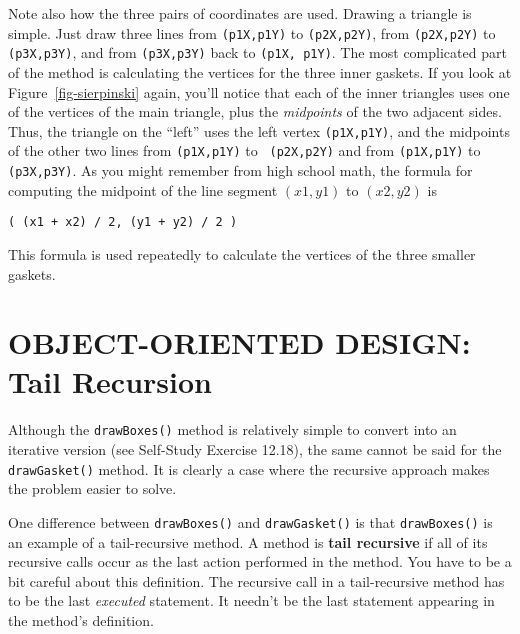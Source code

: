 Note also how the three pairs of coordinates are used.  Drawing a
triangle is simple.  Just draw three lines from {\tt (p1X,p1Y)} to
{\tt (p2X,p2Y)}, from {\tt (p2X,p2Y)} to {\tt (p3X,p3Y)}, and from
{\tt (p3X,p3Y)} back to {\tt (p1X, p1Y)}. The most complicated part of
the method is calculating the vertices for the three inner gaskets.
If you look at Figure~\ref{fig-sierpinski} again, you'll notice that
each of the inner triangles uses one of the vertices of the main
triangle, plus the {\it midpoints} of the two adjacent sides.  Thus,
the triangle on the ``left'' uses the left vertex {\tt (p1X,p1Y)}, and
the midpoints of the other two lines from {\tt (p1X,p1Y)} to {\tt
(p2X,p2Y)} and from {\tt (p1X,p1Y)} to {\tt (p3X,p3Y)}.  As you might
remember from high school math, the formula for computing the midpoint
of the line segment $(x1,y1)$ to $(x2,y2)$ is

\begin{jjjlisting}
\begin{lstlisting}
( (x1 + x2) / 2, (y1 + y2) / 2 )
\end{lstlisting}
\end{jjjlisting}

\noindent This formula is used repeatedly to calculate the
vertices of the three smaller gaskets.


\section{OBJECT-ORIENTED DESIGN:\\ Tail Recursion}
\noindent Although the {\tt drawBoxes()} method is relatively simple to convert
into an iterative version (see Self-Study Exercise 12.18), the same cannot be said for the
{\tt drawGasket()} method.  It is clearly a case where the recursive
approach makes the problem easier to solve.

One difference between {\tt drawBoxes()} and {\tt drawGasket()} is
that {\tt drawBoxes()} is an example of a tail-recursive method.   A
method is {\bf tail recursive} 
if all of its recursive calls occur as
the last action performed in the method.  You have to be a bit careful
about this definition.  The recursive call in a tail-recursive method
has to be the last {\it executed} statement.  It needn't be the last
statement appearing in the method's definition.

